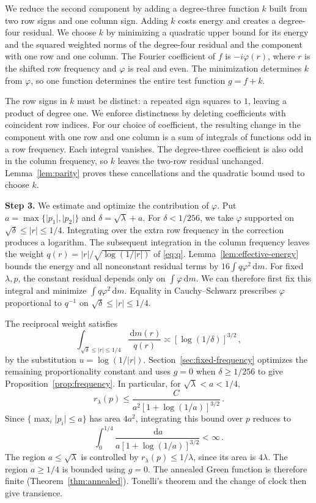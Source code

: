 \documentclass[11pt]{amsart}
\theoremstyle{plain}
\theoremstyle{definition}
\newcommand{\1}{\mathbf 1}
\newcommand{\abs}[1]{\lvert #1\rvert}
\newcommand{\dd}{\,\mathrm d}
\begin{document}
We reduce the second component by adding a degree-three function $k$ built
from two row signs and one column sign.  Adding $k$ costs energy and
creates a degree-four residual.  We choose $k$ by minimizing a quadratic
upper bound for its energy and the squared weighted norms of the
degree-four residual and the component with one row and one column.
The Fourier coefficient of $f$ is $-i\varphi(r)$, where $r$ is the shifted
row frequency and $\varphi$ is real and even.  The minimization determines
$k$ from $\varphi$, so one function determines the entire test function
$g=f+k$.

The row signs in $k$ must be distinct: a repeated sign squares to $1$,
leaving a product of degree one.  We enforce distinctness by deleting
coefficients with coincident row indices.  For our choice of coefficient,
the resulting change in the component with one row and one column is a
sum of integrals of functions odd in a row frequency.  Each integral vanishes.
The degree-three coefficient
is also odd in the column frequency, so $k$ leaves the two-row residual
unchanged.  Lemma~\ref{lem:parity} proves these cancellations and the
quadratic bound used to choose $k$.

\medskip
\noindent\textbf{Step 3.}  We estimate and optimize the contribution of
$\varphi$.  Put $a=\max\{\abs{p_1},\abs{p_2}\}$ and
$\delta=\sqrt\lambda+a$.  For $\delta<1/256$, we take $\varphi$ supported on
$\sqrt\delta\leq\abs r\leq1/4$.
Integrating over the extra row frequency in the correction
produces a logarithm.  The subsequent integration in the column frequency
leaves the weight
$q(r)=\abs r/\sqrt{\log(1/\abs r)}$ of \eqref{eq:q}.
Lemma~\ref{lem:effective-energy} bounds the energy and all nonconstant
residual terms by $16\int q\varphi^2\dd m$.  For fixed $\lambda,p$, the
constant residual depends only on $\int\varphi\dd m$.  We can therefore
first fix this integral and minimize $\int q\varphi^2\dd m$.
Equality in Cauchy--Schwarz prescribes $\varphi$ proportional to $q^{-1}$
on $\sqrt\delta\leq\abs r\leq1/4$.

The reciprocal weight satisfies
\[
  \int_{\sqrt\delta\leq\abs r\leq1/4}\frac{\dd m(r)}{q(r)}
  \asymp[\log(1/\delta)]^{3/2}\, ,
\]
by the substitution $u=\log(1/\abs r)$.
Section~\ref{sec:fixed-frequency} optimizes the remaining proportionality
constant and uses $g=0$ when $\delta\geq1/256$ to give
Proposition~\ref{prop:frequency}.  In particular, for $\sqrt\lambda<a<1/4$,
\[
  r_\lambda(p)\leq\frac{C}{a^2[1+\log(1/a)]^{3/2}}\, .
\]
Since $\{\max_i\abs{p_i}\leq a\}$ has area $4a^2$, integrating this bound
over $p$ reduces to
\[
  \int_0^{1/4}\frac{\dd a}{a[1+\log(1/a)]^{3/2}}<\infty\, .
\]
The region $a\leq\sqrt\lambda$ is controlled by
$r_\lambda(p)\leq1/\lambda$, since its area is $4\lambda$.
The region $a\geq1/4$ is bounded using $g=0$.
The annealed Green function is therefore finite
(Theorem~\ref{thm:annealed}).  Tonelli's theorem and the change of clock
then give transience.
\end{document}
